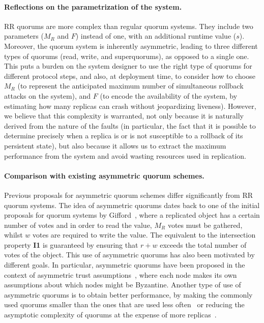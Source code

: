 \paragraph{Reflections on the parametrization of the system.}
\ac{RR} quorums are more complex than regular
quorum systems. They include two parameters ($M_R$ and $F$) instead of
one, with an additional runtime value ($s$). Moreover, the quorum
system is inherently asymmetric, leading to three different types of
quorums (read, write, and superquorums), as opposed to a single one.
This puts a burden on the system designer to use the right type of quorums for
different protocol steps, and also, at deployment time, to consider how to
choose $M_R$ (to represent the anticipated maximum number of simultaneous rollback
attacks on the system), and $F$
(to encode the availability of the system, by estimating how many replicas
can crash without jeopardizing liveness).
%
However, we believe that this complexity is warranted, not only
because it is naturally derived from the nature of the faults (in
particular, the fact that it is possible to determine precisely when a
replica is or is not susceptible to a rollback of its persistent
state), but also because it allows us to extract the maximum
performance from the system and avoid wasting resources used in
replication.


\paragraph{Comparison with existing asymmetric quorum schemes.}

Previous proposals for asymmetric quorum schemes differ significantly
from \ac{RR} quorum systems.  The idea of asymmetric quorums dates back to one of the
initial proposals for quorum systems by
Gifford~\cite{weighted_voting}, where a replicated object has a
certain number of votes and in order to read the value, $M_R$ votes must
be gathered, whilst $w$ votes are required to write the value. The
equivalent to the intersection property \textbf{I1} is guaranteed by
ensuring that $r + w$ exceeds the total number of votes of the object.
This use of asymmetric quorums has also been motivated by different
goals.  In particular, asymmetric quorums have been proposed in the
context of asymmetric trust assumptions~\cite{asymmetric_trust}, where
each node makes its own assumptions about which nodes might be
Byzantine. Another type of use of asymmetric quorums is to obtain
better performance, by making the commonly used quorums smaller than
the ones that are used less often~\cite{fp,wheat,rqs} or reducing the
asymptotic complexity of quorums at the expense of more replicas~\cite{grid_quorums}.

